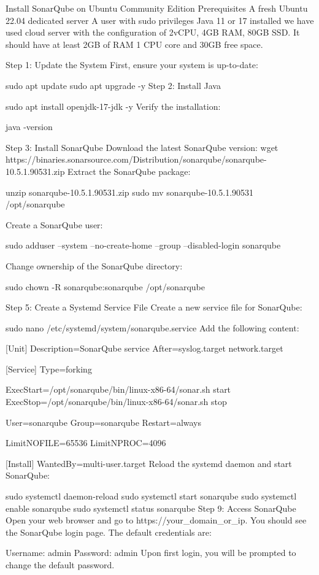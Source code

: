 Install SonarQube on Ubuntu Community Edition
Prerequisites
A fresh Ubuntu 22.04 dedicated server
A user with sudo privileges
Java 11 or 17 installed 
we have used cloud server with the configuration of 2vCPU, 4GB RAM, 80GB SSD. 
It should have at least 2GB of RAM 1 CPU core and 30GB free space.

Step 1: Update the System
First, ensure your system is up-to-date:

sudo apt update
sudo apt upgrade -y
Step 2: Install Java


sudo apt install openjdk-17-jdk -y
Verify the installation:

java -version

Step 3: Install SonarQube
Download the latest SonarQube version:
wget https://binaries.sonarsource.com/Distribution/sonarqube/sonarqube-10.5.1.90531.zip
Extract the SonarQube package:

unzip sonarqube-10.5.1.90531.zip
sudo mv sonarqube-10.5.1.90531 /opt/sonarqube

Create a SonarQube user:

sudo adduser --system --no-create-home --group --disabled-login sonarqube

Change ownership of the SonarQube directory:

sudo chown -R sonarqube:sonarqube /opt/sonarqube

Step 5: Create a Systemd Service File
Create a new service file for SonarQube:

sudo nano /etc/systemd/system/sonarqube.service
Add the following content:

[Unit]
Description=SonarQube service
After=syslog.target network.target

[Service]
Type=forking

ExecStart=/opt/sonarqube/bin/linux-x86-64/sonar.sh start
ExecStop=/opt/sonarqube/bin/linux-x86-64/sonar.sh stop

User=sonarqube
Group=sonarqube
Restart=always

LimitNOFILE=65536
LimitNPROC=4096

[Install]
WantedBy=multi-user.target
Reload the systemd daemon and start SonarQube:

sudo systemctl daemon-reload
sudo systemctl start sonarqube
sudo systemctl enable sonarqube
sudo systemctl status sonarqube
Step 9: Access SonarQube
Open your web browser and go to https://your_domain_or_ip. 
You should see the SonarQube login page. The default credentials are:

Username: admin
Password: admin
Upon first login, you will be prompted to change the default password.


